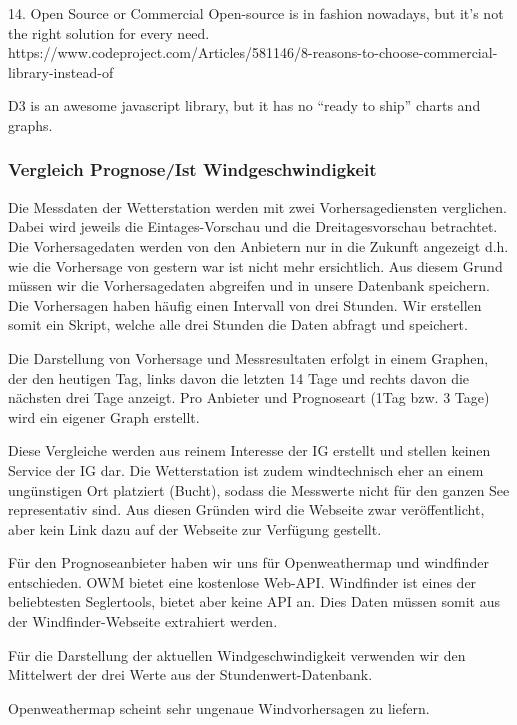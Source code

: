14. Open Source or Commercial
 Open-source is in fashion nowadays, but it’s not the right solution for every need.
 https://www.codeproject.com/Articles/581146/8-reasons-to-choose-commercial-library-instead-of



 D3 is an awesome javascript library, but it has no “ready to ship” charts and graphs.


\subsubsection{Vergleich Prognose/Ist Windgeschwindigkeit}

Die Messdaten der Wetterstation werden mit zwei Vorhersagediensten verglichen. Dabei wird jeweils die Eintages-Vorschau und die Dreitagesvorschau betrachtet.
Die Vorhersagedaten werden von den Anbietern nur in die Zukunft angezeigt d.h. wie die Vorhersage von gestern war ist nicht mehr ersichtlich. Aus diesem Grund müssen wir die Vorhersagedaten abgreifen und in unsere Datenbank speichern. Die Vorhersagen haben häufig einen Intervall von drei Stunden. Wir erstellen somit ein Skript, welche alle drei Stunden die Daten abfragt und speichert.

Die Darstellung von Vorhersage und Messresultaten erfolgt in einem Graphen, der den heutigen Tag, links davon die letzten 14 Tage und rechts davon die nächsten drei Tage anzeigt. Pro Anbieter und Prognoseart (1Tag bzw. 3 Tage) wird ein eigener Graph erstellt.

Diese Vergleiche werden aus reinem Interesse der IG erstellt und stellen keinen Service der IG dar. Die Wetterstation ist zudem windtechnisch eher an einem ungünstigen Ort platziert (Bucht), sodass die Messwerte nicht für den ganzen See representativ sind.
Aus diesen Gründen wird die Webseite zwar veröffentlicht, aber kein Link dazu auf der Webseite zur Verfügung gestellt.

Für den Prognoseanbieter haben wir uns für Openweathermap und windfinder entschieden. OWM bietet eine kostenlose Web-API. Windfinder ist eines der beliebtesten Seglertools, bietet aber keine API an. Dies Daten müssen somit aus der Windfinder-Webseite extrahiert werden.

Für die Darstellung der aktuellen Windgeschwindigkeit verwenden wir den Mittelwert der drei Werte aus der Stundenwert-Datenbank.

Openweathermap scheint sehr ungenaue Windvorhersagen zu liefern.

\newline



